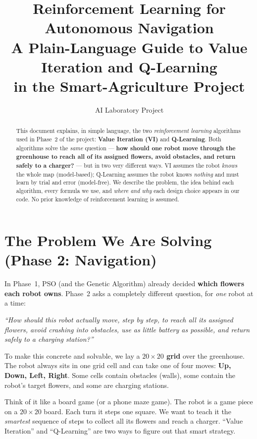 \documentclass[11pt]{article}
\title{\textbf{Reinforcement Learning for Autonomous Navigation}\\[4pt]
\large A Plain-Language Guide to Value Iteration and Q-Learning\\ in the
Smart-Agriculture Project}
\author{AI Laboratory Project}
\date{}
\begin{document}
\maketitle

\begin{abstract}
\noindent
This document explains, in simple language, the two \emph{reinforcement
learning} algorithms used in Phase~2 of the project: \textbf{Value Iteration
(VI)} and \textbf{Q-Learning}. Both algorithms solve the \emph{same} question ---
\textbf{how should one robot move through the greenhouse to reach all of its
assigned flowers, avoid obstacles, and return safely to a charger?} --- but in
two very different ways. VI assumes the robot \emph{knows} the whole map
(model-based); Q-Learning assumes the robot knows \emph{nothing} and must learn
by trial and error (model-free). We describe the problem, the idea behind each
algorithm, every formula we use, and \emph{where and why} each design choice
appears in our code. No prior knowledge of reinforcement learning is assumed.
\end{abstract}

\tableofcontents

\section{The Problem We Are Solving (Phase 2: Navigation)}

In Phase~1, PSO (and the Genetic Algorithm) already decided \textbf{which flowers each robot
owns}. Phase~2 asks a completely different question, for \emph{one} robot at a
time:

\begin{center}
\emph{``How should this robot actually move, step by step, to reach all its
assigned flowers, avoid crashing into obstacles, use as little battery as
possible, and return safely to a charging station?''}
\end{center}

To make this concrete and solvable, we lay a \textbf{$20\times20$ grid} over the
greenhouse. The robot always sits in one grid cell and can take one of four
moves: \textbf{Up, Down, Left, Right}. Some cells contain obstacles (walls),
some contain the robot's target flowers, and some are charging stations.

\begin{intuition}
Think of it like a board game (or a phone maze game). The robot is a game piece
on a $20\times20$ board. Each turn it steps one square. We want to teach it the
\emph{smartest} sequence of steps to collect all its flowers and reach a
charger. ``Value Iteration'' and ``Q-Learning'' are two ways to figure out that
smart strategy.
\end{intuition}
\end{document}
